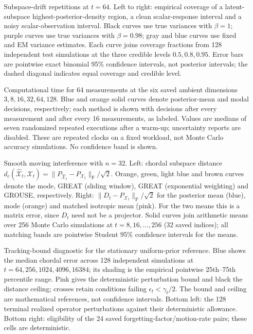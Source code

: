 \caption{Subspace-drift repetitions at $t=64$. Left to right: empirical coverage of a latent-subspace highest-posterior-density region, a clean scalar-response interval and a noisy scalar-observation interval. Black curves use true variances with $\beta=1$; purple curves use true variances with $\beta=0.98$; gray and blue curves use fixed and EM variance estimates. Each curve joins coverage fractions from 128 independent test simulations at the three credible levels $0.5,0.8,0.95$. Error bars are pointwise exact binomial 95\% confidence intervals, not posterior intervals; the dashed diagonal indicates equal coverage and credible level.}

\caption{Computational time for 64 measurements at the six saved ambient dimensions $3,8,16,32,64,128$. Blue and orange solid curves denote posterior-mean and modal decisions, respectively; each method is shown with decisions after every measurement and after every 16 measurements, as labeled. Values are medians of seven randomized repeated executions after a warm-up; uncertainty reports are disabled. These are repeated clocks on a fixed workload, not Monte Carlo accuracy simulations. No confidence band is shown.}

\caption{Smooth moving interference with $n=32$. Left: chordal subspace distance $d_c(\widehat{\mathcal X}_t,\mathcal X_t)=\|P_{\widehat{\mathcal X}_t}-P_{\mathcal X_t}\|_{\mathrm F}/\sqrt2$. Orange, green, light blue and brown curves denote the mode, GREAT (sliding window), GREAT (exponential weighting) and GROUSE, respectively. Right: $\|D_t-P_{\mathcal X_t}\|_{\mathrm F}/\sqrt2$ for the posterior mean (blue), mode (orange) and matched isotropic mean (pink). For the two means this is a matrix error, since $D_t$ need not be a projector. Solid curves join arithmetic means over 256 Monte Carlo simulations at $t=8,16,\ldots,256$ (32 saved indices); all matching bands are pointwise Student 95\% confidence intervals for the means.}

\caption{Tracking-bound diagnostic for the stationary uniform-prior reference. Blue shows the median chordal error across 128 independent simulations at $t=64,256,1024,4096,16384$; its shading is the empirical pointwise 25th--75th percentile range. Pink gives the deterministic perturbation bound and black the distance ceiling; crosses retain conditions failing $\epsilon_t<\gamma_t/2$. The bound and ceiling are mathematical references, not confidence intervals. Bottom left: the 128 terminal realized operator perturbations against their deterministic allowance. Bottom right: eligibility of the 24 saved forgetting-factor/motion-rate pairs; these cells are deterministic.}

